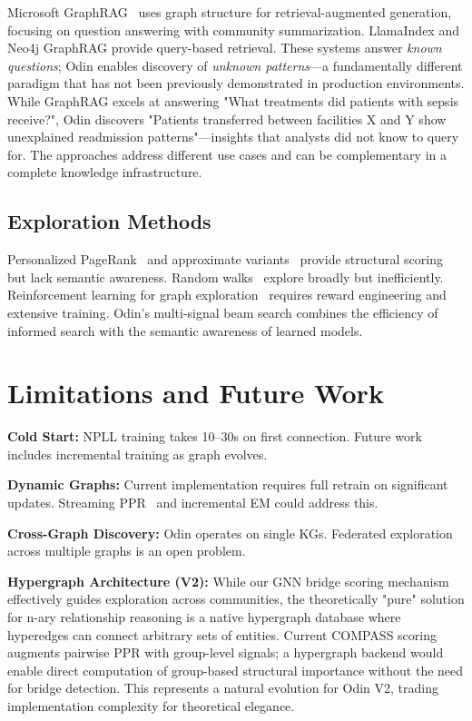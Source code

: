 \documentclass[10pt,twocolumn]{article}
\begin{document}
Microsoft GraphRAG~\cite{edge2024local} uses graph structure for retrieval-augmented generation, focusing on question answering with community summarization. LlamaIndex and Neo4j GraphRAG provide query-based retrieval. These systems answer \textit{known questions}; Odin enables discovery of \textit{unknown patterns}---a fundamentally different paradigm that has not been previously demonstrated in production environments. While GraphRAG excels at answering "What treatments did patients with sepsis receive?", Odin discovers "Patients transferred between facilities X and Y show unexplained readmission patterns"---insights that analysts did not know to query for. The approaches address different use cases and can be complementary in a complete knowledge infrastructure.

\subsection{Exploration Methods}

Personalized PageRank~\cite{haveliwala2002topic} and approximate variants~\cite{andersen2006local} provide structural scoring but lack semantic awareness. Random walks~\cite{perozzi2014deepwalk} explore broadly but inefficiently. Reinforcement learning for graph exploration~\cite{chen2017dialogue} requires reward engineering and extensive training. Odin's multi-signal beam search combines the efficiency of informed search with the semantic awareness of learned models.

\section{Limitations and Future Work}

\textbf{Cold Start:} NPLL training takes 10--30s on first connection. Future work includes incremental training as graph evolves.

\textbf{Dynamic Graphs:} Current implementation requires full retrain on significant updates. Streaming PPR~\cite{bahmani2010fast} and incremental EM could address this.

\textbf{Cross-Graph Discovery:} Odin operates on single KGs. Federated exploration across multiple graphs is an open problem.

\textbf{Hypergraph Architecture (V2):} While our GNN bridge scoring mechanism effectively guides exploration across communities, the theoretically "pure" solution for n-ary relationship reasoning is a native hypergraph database where hyperedges can connect arbitrary sets of entities. Current COMPASS scoring augments pairwise PPR with group-level signals; a hypergraph backend would enable direct computation of group-based structural importance without the need for bridge detection. This represents a natural evolution for Odin V2, trading implementation complexity for theoretical elegance.
\end{document}
